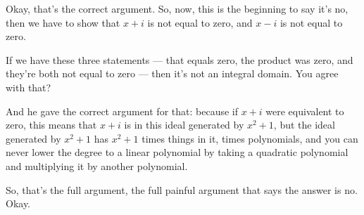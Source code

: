 \begin{speech}[01:17:43 - 01:18:56]
Okay, that's the correct argument. So, now, this is the beginning to say it's no, then we have to show that $x + i$ is not equal to zero, and $x - i$ is not equal to zero.  

If we have these three statements --- that equals zero, the product was zero, and they're both not equal to zero --- then it's not an integral domain. You agree with that? 

And he gave the correct argument for that: because if $x + i$ were equivalent to zero,  this means that $x + i$ is in this ideal generated by $x^2 + 1$,  but the ideal generated by $x^2 + 1$ has $x^2 + 1$ times things in it, times polynomials, and you can never lower the degree to a linear polynomial by taking a quadratic polynomial and multiplying it by another polynomial. 

So, that's the full argument, the full painful argument that says the answer is no. Okay.
\end{speech}

